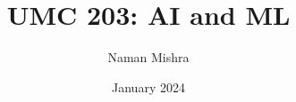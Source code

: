 \documentclass[12pt]{report}
\title{UMC 203: AI and ML}
\author{Naman Mishra}
\date{January 2024}
\begin{document}
\maketitle
\tableofcontents
\newpage
\listoflecture
    
    
    
    
    
    
    
    
    
    
    
    
    
    
    
    
    
    
    
    
    
    
\end{document}
